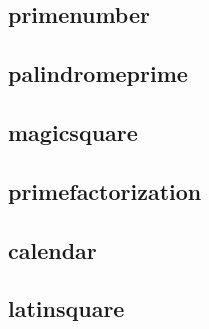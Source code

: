     \subsection{primenumber}
        
    \subsection{palindromeprime}
        
    \subsection{magicsquare}
        
    \subsection{primefactorization}
        
    \subsection{calendar}
        
    \subsection{latinsquare}
        
        
        
        